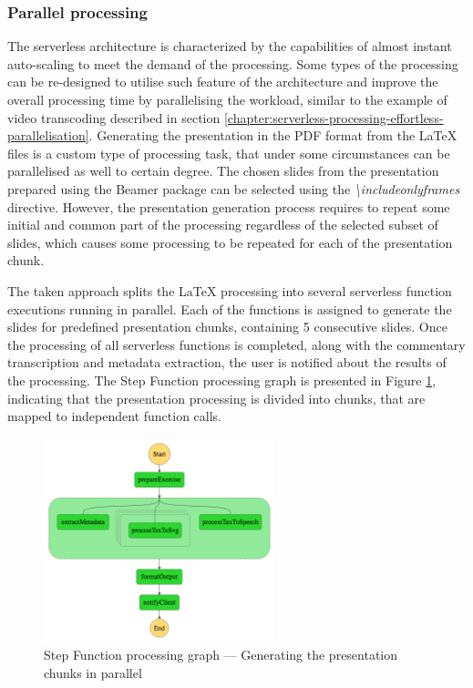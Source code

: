 \subsubsection{Parallel processing} \label{section:case-study-parallel-processing}

The serverless architecture is characterized by the capabilities of almost instant auto-scaling to meet the demand of the processing.
Some types of the processing can be re-designed to utilise such feature of the architecture and improve the overall processing time by parallelising the workload, similar to the example of video transcoding described in section \ref{chapter:serverless-processing-effortless-parallelisation}.
Generating the presentation in the PDF format from the LaTeX files is a custom type of processing task, that under some circumstances can be parallelised as well to certain degree.
The chosen slides from the presentation prepared using the Beamer package \cite{beamer} can be selected using the \textit{\textbackslash includeonlyframes} directive.
However, the presentation generation process requires to repeat some initial and common part of the processing regardless of the selected subset of slides, which causes some processing to be repeated for each of the presentation chunk.

The taken approach splits the LaTeX processing into several serverless function executions running in parallel. Each of the functions is assigned to generate the slides for predefined presentation chunks, containing 5 consecutive slides. Once the processing of all serverless functions is completed, along with the commentary transcription and metadata extraction, the user is notified about the results of the processing. The Step Function processing graph is presented in Figure \ref{fig:step-function-processing-the-presentation-in-parallel}, indicating that the presentation processing is divided into chunks, that are mapped to independent function calls.

\begin{figure}[H]
    \centering
    \includegraphics[width=0.6\textwidth]{assets/04-serverless-for-web-apps/stepFunctionGraphParallel.png}
    \caption{Step Function processing graph --- Generating the presentation chunks in parallel}
    \label{fig:step-function-processing-the-presentation-in-parallel}
\end{figure}

